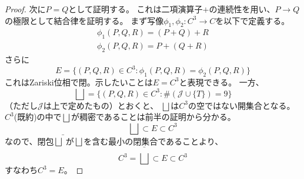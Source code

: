 \documentclass[a4paper]{jsarticle}
\begin{document}
\begin{proof}
            次に$P=Q$として証明する。
            これは二項演算子$+$の連続性を用い、$P \to Q$の極限として結合律を証明する。
            まず写像$\phi_1, \phi_2 : C^3 \to C$を以下で定義する。
            \begin{eqnarray}
                \phi_1(P, Q, R)=(P+Q)+R \\
                \phi_2(P, Q, R)=P+(Q+R)
            \end{eqnarray}
            さらに
            \[ E=\{ (P, Q, R) \in C^3 : \phi_1(P, Q, R)=\phi_2(P, Q, R) \} \]
            これはZariski位相で閉。示したいことは$E=C^3$と表現できる。
            一方、
            \[ \bigsqcup=\{ (P, Q, R) \in C^3 : \#(\mathcal{J} \cup \{T\})=9 \} \]
            （ただし$\mathcal{J}$は上で定めたもの）とおくと、
            $\bigsqcup$は$C^3$の空ではない開集合となる。
            $C^3$(既約)の中で$\bigsqcup$が稠密であることは前半の証明から分かる。
            \[ \bigsqcup \subset E \subset C^3 \]
            なので、閉包$\bar{\bigsqcup}$が$\bigsqcup$を含む最小の閉集合であることより、
            \[ C^3=\bar{\bigsqcup} \subset E \subset C^3 \]
            すなわち$C^3=E$。
        \end{proof}
\end{document}

